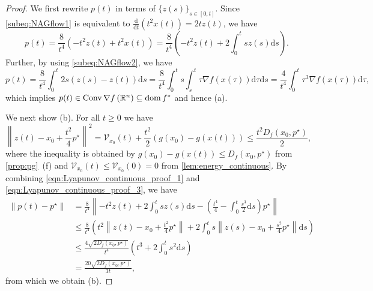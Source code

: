 \documentclass[11pt,a4paper]{article}
\theoremstyle{definition}
\theoremstyle{plain}
\newcommand{\RR}{{\mathbb{R}}}
\newcommand{\rmd}{{\mathrm{d}}}
\newcommand{\dom}{\mathop{\rm dom}}
\newcommand{\conv}{\mathop{\rm Conv}}
\begin{document}
\begin{proof}
    We first rewrite $p(t)$ in terms of $\{z(s)\}_{s \in [0, t]}$.
    Since \eqref{subeq:NAGflow1} is equivalent to $\frac{\rmd}{\rmd t}\left(t^2x(t)\right) = 2tz(t)$, we have
    \begin{equation}\label{eqn:Lyapunov_continuous_proof_1}
        p(t) = \frac8{t^4}\left(-t^2z(t) + t^2x(t)\right) = \frac8{t^4}\left(-t^2z(t) + 2\int_0^tsz(s)\rmd s\right).
    \end{equation}
    Further, by using \eqref{subeq:NAGflow2}, we have
    \begin{equation}\label{eqn:Lyapunov_continuous_proof_2}
        p(t) = \frac8{t^4}\int_0^t2s\left(z(s) - z(t)\right)\rmd s = \frac8{t^4}\int_0^ts\int_s^t\tau\nabla f\left(x(\tau)\right)\rmd\tau\rmd s = \frac4{t^4}\int_0^t\tau^3\nabla f\left(x(\tau)\right)\rmd\tau,
    \end{equation}
    which implies $p(t) \in \conv\nabla f\left(\RR^n\right) \subseteq \dom f^\ast$ and hence (a).

    We next show (b).
    For all $t \ge 0$ we have
    \begin{equation}\label{eqn:Lyapunov_continuous_proof_3}
        \left\|z(t) - x_0 + \frac{t^2}4p^\star\right\|^2
        = \mathcal{V}_{x_0}(t) + \frac{t^2}2\left(g(x_0) - g(x(t))\right)
        \le \frac{t^2D_f(x_0, p^\star)}2,
    \end{equation}
    where the inequality is obtained by $g(x_0) - g(x(t)) \le D_f(x_0, p^\star)$ from \cref{prop:pg}~(f) and $\mathcal{V}_{x_0}(t) \le \mathcal{V}_{x_0}(0) = 0$ from \cref{lem:energy_continuous}.
    By combining \eqref{eqn:Lyapunov_continuous_proof_1} and \eqref{eqn:Lyapunov_continuous_proof_3}, we have
    \begin{align*}
        \|p(t) - p^\star\|
        &= \frac8{t^4}\left\|-t^2z(t) + 2\int_0^tsz(s)\rmd s - \left(\frac{t^4}4 - \int_0^t\frac{s^3}2\rmd s\right)p^\star\right\|\\
        &\le \frac8{t^4}\left(t^2\left\|z(t) - x_0 + \frac{t^2}4p^\star\right\| + 2\int_0^ts\left\|z(s) - x_0 + \frac{s^2}4p^\star\right\|\rmd s\right)\\
        &\le \frac{4\sqrt{2D_f(x_0, p^\star)}}{t^4}\left(t^3 + 2\int_0^ts^2\rmd s\right)\\
        &= \frac{20\sqrt{2D_f(x_0, p^\star)}}{3t},
    \end{align*}
    from which we obtain (b).


\end{proof}
\end{document}
